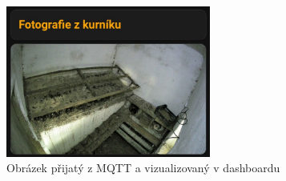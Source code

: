 \begin{figure}[H]
    \centering
    \includegraphics[width=0.6\textwidth]{img/foto_z_guarda}
    \caption{Obrázek přijatý z MQTT a vizualizovaný v dashboardu}
    \label{fig:foto_z_guarda}
\end{figure}

%
